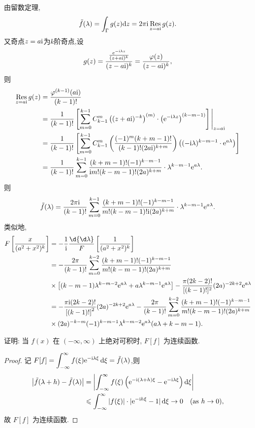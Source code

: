 \begin{solution}
	由留数定理,
  	$$\tilde{f}(\lambda)=\int_{\Gamma}g(z)\mathrm{d}z=2\pi\mathrm{i}\operatorname*{Res}_{z=a\mathrm{i}}g(z).$$
  	又奇点$z=a\mathrm{i}$为$k$阶奇点,设
  	$$g(z)=\frac{\frac{e^{-\mathrm{i}\lambda z}}{(z+a\mathrm{i})^k}}{(z-a\mathrm{i})^k}=\frac{\varphi(z)}{(z-a\mathrm{i})^k},$$
  	则
  	$$\begin{aligned}
  	\operatorname*{Res}_{z=a\mathrm{i}}g(z)&=\frac{\varphi^{(k-1)}(a\mathrm{i})}{(k-1)!} \\
  	&=\frac1{(k-1)!}\left[\sum_{m=0}^{k-1}C_{k-1}^m\left((z+a\mathrm{i})^{-k}\right)^{(m)}\cdot\left(\mathrm{e}^{-\mathrm{i}\lambda z}\right)^{(k-m-1)}\right]\Bigg|_{z=a\mathrm{i}} \\
  	&=\frac1{(k-1)!}\left[\sum_{m=0}^{k-1}C_{k-1}^m\left(\frac{(-1)^m(k+m-1)!}{(k-1)!(2a\mathrm{i})^{k+m}}\right)\left((-\mathrm{i}\lambda)^{k-m-1}\cdot\mathrm{e}^{a\lambda}\right)\right] \\
  	&=\frac1{(k-1)!}\sum_{m=0}^{k-1}\frac{(k+m-1)!(-1)^{k-m-1}}{\mathrm{i} m!(k-m-1)!(2a)^{k+m}}\cdot\lambda^{k-m-1}\mathrm{e}^{a\lambda}.
  	\end{aligned}$$
  	则
  	$$\tilde{f}(\lambda)=\frac{2\pi\mathrm{i}}{(k-1)!}\sum_{m=0}^{k-1}\frac{(k+m-1)!(-1)^{k-m-1}}{m!(k-m-1)!\mathrm{i}(2a)^{k+m}}\cdot\lambda^{k-m-1}\mathrm{e}^{a\lambda}.$$
  	类似地,
  	$$\begin{aligned}
  		F\left[\frac x{(a^2+x^2)^k}\right]
  		&=-\frac{1}{\upi}\frac \d{\d\lambda}F\left[\frac1{(a^2+x^2)^k}\right] \\
  		&=-\frac{2\pi}{(k-1)!}\sum_{m=0}^{k-2}\frac{(k+m-1)!(-1)^{k-m-1}}{m!(k-m-1)!(2a)^{k+m}} \\
  		&\times\left[(k-m-1)\lambda^{k-m-2}\e^{a\lambda}+a\lambda^{k-m-1}\e^{a\lambda}\right]-\frac{\pi(2k-2)!}{[(k-1)!]^2}(2a)^{-2k+2}\e^{a\lambda} \\
  		&=-\frac{\pi\upi(2k-2)!}{\left[(k-1)!\right]^2}(2a)^{-2k+2}\e^{a\lambda}-\frac{2\pi}{(k-1)!}\sum_{m=0}^{k-2}\frac{(k+m-1)!(-1)^{k-m-1}}{m!(k-m-1)!(2a)^{k+m}} \\
  		&\times(2a)^{-k-m}(-1)^{k-m-1}\lambda^{k-m-2}\e^{a\lambda}(a\lambda+k-m-1).
  	\end{aligned}$$
\end{solution}


\begin{exercise}
  证明: 当 $f(x)$ 在 $(-\infty,\infty)$ 上绝对可积时, $F[f]$ 为连续函数.
\end{exercise}

\begin{proof}
  记 $\displaystyle F[f]=\int_{-\infty}^{\infty} f(\xi)\mathrm{e}^{-\mathrm{i}\lambda\xi}\mathop{}\!\mathrm{d}\xi = \tilde{f}(\lambda)$,则
  \[\begin{split}
    \bigl|\tilde{f}(\lambda+h)-\tilde{f}(\lambda)\bigr|
    & = \left|\int_{-\infty}^{\infty}f(\xi)
        \left(\mathrm{e}^{-\mathrm{i}(\lambda+h)\xi} - \mathrm{e}^{-\mathrm{i}\lambda\xi}\right)\mathop{}\!\mathrm{d}\xi\right| \\
    & \leqslant \int_{-\infty}^{\infty}|f(\xi)|\cdot|\mathrm{e}^{-\mathrm{i} h\xi}-1|\mathop{}\!\mathrm{d}\xi\to 0
      \quad(\text{as } h\to 0),
  \end{split}\]
  故 $F[f]$ 为连续函数.
\end{proof}


